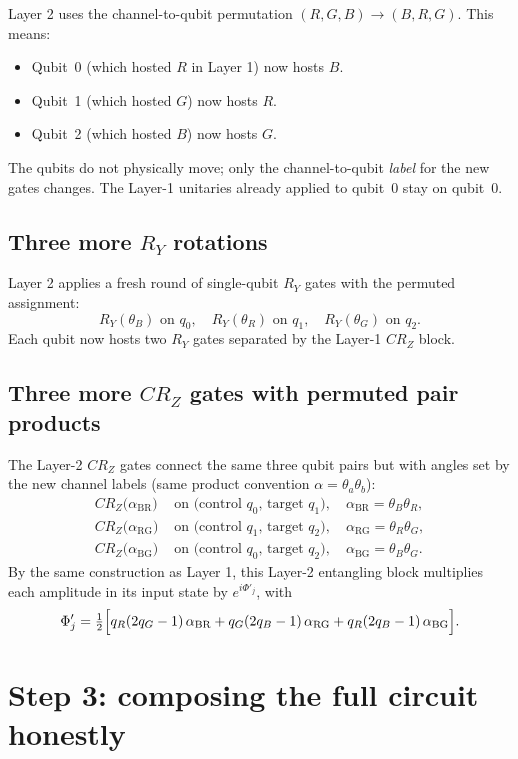 \documentclass[11pt]{article}
\begin{document}
Layer 2 uses the channel-to-qubit permutation $(R, G, B) \to (B, R, G)$. This means:
\begin{itemize}
\item Qubit~0 (which hosted $R$ in Layer 1) now hosts $B$.
\item Qubit~1 (which hosted $G$) now hosts $R$.
\item Qubit~2 (which hosted $B$) now hosts $G$.
\end{itemize}
The qubits do not physically move; only the channel-to-qubit \emph{label} for the new gates changes. The Layer-1 unitaries already applied to qubit~0 stay on qubit~0.

\subsection{Three more $R_Y$ rotations}

Layer 2 applies a fresh round of single-qubit $R_Y$ gates with the permuted assignment:
\[
R_Y(\theta_B) \text{ on } q_0, \quad R_Y(\theta_R) \text{ on } q_1, \quad R_Y(\theta_G) \text{ on } q_2.
\]
Each qubit now hosts two $R_Y$ gates separated by the Layer-1 $CR_Z$ block.

\subsection{Three more $CR_Z$ gates with permuted pair products}

The Layer-2 $CR_Z$ gates connect the same three qubit pairs but with angles set by the new channel labels (same product convention $\alpha = \theta_a \theta_b$):
\begin{align*}
CR_Z\bigl(\alpha_\text{BR}\bigr) &\text{ on (control } q_0\text{, target } q_1\text{)}, \quad \alpha_\text{BR} = \theta_B \theta_R, \\
CR_Z\bigl(\alpha_\text{RG}\bigr) &\text{ on (control } q_1\text{, target } q_2\text{)}, \quad \alpha_\text{RG} = \theta_R \theta_G, \\
CR_Z\bigl(\alpha_\text{BG}\bigr) &\text{ on (control } q_0\text{, target } q_2\text{)}, \quad \alpha_\text{BG} = \theta_B \theta_G.
\end{align*}
By the same construction as Layer 1, this Layer-2 entangling block multiplies each amplitude in its input state by $e^{i\Phi'_j}$, with
\[
\Phi'_j = \tfrac{1}{2}\Bigl[ q_R (2 q_G - 1)\, \alpha_\text{BR} + q_G (2 q_B - 1)\, \alpha_\text{RG} + q_R (2 q_B - 1)\, \alpha_\text{BG} \Bigr].
\]

\section{Step 3: composing the full circuit honestly}
\end{document}
